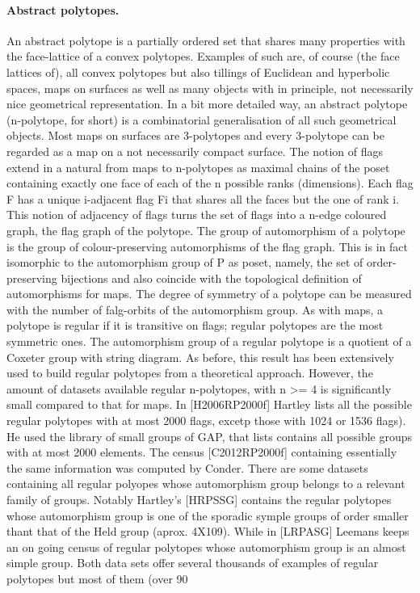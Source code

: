 \paragraph{Abstract polytopes.} An abstract polytope is a partially ordered set that shares many properties with the face-lattice of a convex polytopes. Examples of such are, of course (the face lattices of), all convex polytopes but also tillings of Euclidean and hyperbolic spaces, maps on surfaces as well as many objects with in principle, not necessarily nice geometrical representation. In a bit more detailed way, an abstract polytope (n-polytope, for short) is a combinatorial generalisation of all such geometrical objects. Most maps on surfaces are 3-polytopes and every 3-polytope can be regarded as a map on a not necessarily compact surface. The notion of flags extend in a natural from maps to n-polytopes as maximal chains of the poset containing exactly one face of each of the  n possible ranks (dimensions). Each flag F has a unique i-adjacent flag Fi that shares all the faces but the one of rank i. This notion of adjacency of flags turns the set of flags into a n-edge coloured graph, the flag graph of the polytope. The group of automorphism of a polytope is the group of colour-preserving automorphisms of the flag graph. This is in fact isomorphic to the automorphism group of P as poset, namely, the set of order-preserving bijections and also coincide with the topological definition of automorphisms for maps. The degree of symmetry of a polytope can be measured with the number of falg-orbits of the automorphism group. As with maps, a polytope is regular if it is transitive on flags; regular polytopes are the most symmetric ones. The automorphism group of a regular polytope is a quotient of a Coxeter group with string diagram. As before, this result has been extensively used to build regular polytopes from a theoretical approach. However, the amount of datasets available regular n-polytopes, with n >= 4 is significantly small compared to that for maps. In [H2006RP2000f] Hartley lists all the possible regular polytopes with at most 2000 flags, excetp those with 1024 or 1536 flags). He used the library of small groups of GAP, that lists contains all possible groups with at most 2000 elements. The census [C2012RP2000f] containing essentially the same information was computed by Conder. There are some datasets containing all regular polyopes whose automorphism group belongs to a relevant family of groups. Notably Hartley’s [HRPSSG] contains the regular polytopes whose automorphism group is one of the sporadic symple groups of order smaller thant that of the Held group (aprox. 4X109). While in [LRPASG] Leemans keeps an on going census of regular polytopes whose automorphism group is an almost simple group. Both data sets offer several thousands of examples of regular polytopes but most of them (over 90%
